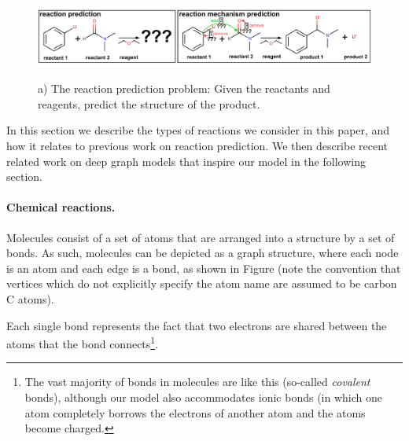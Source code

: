 

\begin{figure}
\centering
\includegraphics[width=\textwidth]{reaction_diagram}
\label{fig:pred_vs_mech}
\caption{a) The reaction prediction problem: Given the reactants and reagents, predict the structure of the product.}
\end{figure}

In this section we describe the types of reactions we consider in this paper, and how it relates to previous work on reaction prediction. We then describe recent related work on deep graph models that inspire our model in the following section.

\paragraph{Chemical reactions.}

Molecules consist of a set of atoms that are arranged into a structure by a set of bonds. 
As such, molecules can be depicted as a graph structure, where each node is an atom and each edge is a bond, 
as shown in Figure (note the convention that vertices which do not explicitly specify the atom name are assumed to be carbon C atoms). 

Each single bond represents the fact that two electrons are shared between the atoms that the bond connects\footnote{The vast majority of bonds in molecules are like this (so-called \emph{covalent} bonds), 
although our model also accommodates ionic bonds 
(in which one atom completely borrows the electrons of another atom and the atoms become charged.}.

